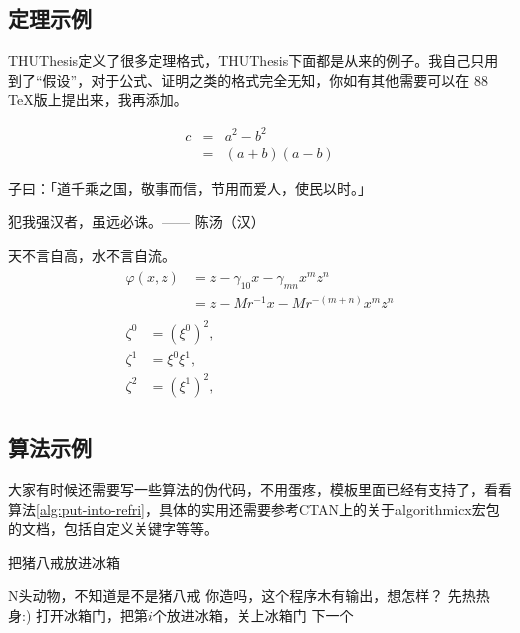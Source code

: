 \subsection{定理示例}

THUThesis定义了很多定理格式，THUThesis下面都是从来的例子。我自己只用到了“假设”，对于公式、证明之类的格式完全无知，你如有其他需要可以在 88 \TeX 版上提出来，我再添加。

\begin{hypo}
  
\begin{eqnarray}
  \label{eq:eqnxmp}
  c & = & a^2 - b^2\\
    & = & (a+b)(a-b)
\end{eqnarray}
\end{hypo}

\begin{defin}
子曰：「道千乘之国，敬事而信，节用而爱人，使民以时。」
\end{defin}

\begin{theo}
犯我强汉者，虽远必诛。\hfill —— 陈汤（汉）
\end{theo}

\begin{pro}
天不言自高，水不言自流。
\begin{gather*}
\begin{split} 
\varphi(x,z)
&=z-\gamma_{10}x-\gamma_{mn}x^mz^n\\
&=z-Mr^{-1}x-Mr^{-(m+n)}x^mz^n
\end{split}\\[6pt]
\begin{align} \zeta^0&=(\xi^0)^2,\\
\zeta^1 &=\xi^0\xi^1,\\
\zeta^2 &=(\xi^1)^2,
\end{align}
\end{gather*}
\end{pro}

\subsection{算法示例}

大家有时候还需要写一些算法的伪代码，不用蛋疼，模板里面已经有支持了，看看算法\ref{alg:put-into-refri}，具体的实用还需要参考CTAN上的关于{\textsf{algorithmicx}}宏包的文档，包括自定义关键字等等。

\begin{algorithm}
\caption{把猪八戒放进冰箱}
\label{alg:put-into-refri}
\begin{algorithmic}[1]
\Require N头动物，不知道是不是猪八戒   
\Ensure 你造吗，这个程序木有输出，想怎样？
\State 先热热身:)
 
	\State 打开冰箱门，把第$i$个放进冰箱，关上冰箱门
\Else 
	\State 下一个
\EndIf
\EndFor
\end{algorithmic}
\end{algorithm}

